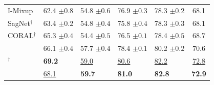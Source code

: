\begin{table}[htbp]
\begin{tabular}{lllll|c}
I-Mixup & 62.4 \scriptsize$\pm0.8$ & 54.8 \scriptsize$\pm0.6$ & 76.9 \scriptsize$\pm0.3$ & 78.3 \scriptsize$\pm0.2$ & 68.1 \\
SagNet$^\dagger$ & 63.4 \scriptsize$\pm0.2$ & 54.8 \scriptsize$\pm0.4$ & 75.8 \scriptsize$\pm0.4$ & 78.3 \scriptsize$\pm0.3$ & 68.1 \\
CORAL$^\dagger$ & 65.3 \scriptsize$\pm0.4$ & 54.4 \scriptsize$\pm0.5$ & 76.5 \scriptsize$\pm0.1$ & 78.4 \scriptsize$\pm0.5$ & 68.7 \\
\swad{} & 66.1 \scriptsize$\pm0.4$ & 57.7 \scriptsize$\pm0.4$ & 78.4 \scriptsize$\pm0.1$ & 80.2 \scriptsize$\pm0.2$ & 70.6 \\
\diwa{}$^\dagger$ & \textbf{69.2} & \underline{59.0} & \underline{80.6} & \underline{82.2} & \underline{72.8} \\
\midrule
\cda{} & \underline{68.1} & \textbf{59.7} & \textbf{81.0} & \textbf{82.8} & \textbf{72.9} \\
\bottomrule
\end{tabular}
\end{table}

